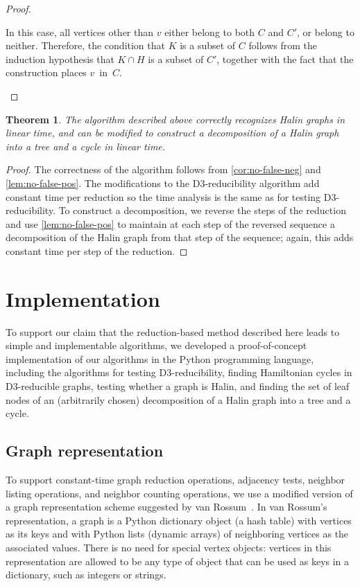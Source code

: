 \documentclass{article}
\newtheorem{theorem}{Theorem}
\begin{document}
\begin{proof}
\begin{itemize}
In this case, all vertices other than $v$ either belong to both $C$ and $C'$, or belong to neither.
Therefore, the condition that $K$ is a subset of $C$ follows from the induction hypothesis that $K\cap H$ is a subset of $C'$, together with the fact that the construction places $v$~in~$C$.\qedhere
\end{itemize}
\end{proof}

\begin{theorem}
The algorithm described above correctly recognizes Halin graphs in linear time,
and can be modified to construct a decomposition of a Halin graph into a tree and a cycle in linear time.
\end{theorem}

\begin{proof}
The correctness of the algorithm follows from \autoref{cor:no-false-neg} and \autoref{lem:no-false-pos}. The modifications to the D3-reducibility algorithm add constant time per reduction so the time analysis is the same as for testing D3-reducibility. To construct a decomposition, we reverse the steps of the reduction and use \autoref{lem:no-false-pos} to maintain at each step of the reversed sequence a decomposition of the Halin graph from that step of the sequence; again, this adds constant time per step of the reduction.
\end{proof}

\section{Implementation}

To support our claim that the reduction-based method described here leads to simple and implementable algorithms, we developed a proof-of-concept implementation of our algorithms in the Python programming language, including the algorithms for testing D3-reducibility, finding Hamiltonian cycles in D3-reducible graphs, testing whether a graph is Halin, and finding the set of leaf nodes of an (arbitrarily chosen) decomposition of a Halin graph into a tree and a cycle.

\subsection{Graph representation}

To support constant-time graph reduction operations, adjacency tests, neighbor listing operations, and neighbor counting operations, we use a modified version of a graph representation scheme suggested by van Rossum~\cite{Ros-PP-98}. In van Rossum's representation, a graph is a Python dictionary object (a hash table) with vertices as its keys and with Python lists (dynamic arrays) of neighboring vertices as the associated values. There is no need for special vertex objects: vertices in this representation are allowed to be any type of object that can be used as keys in a dictionary, such as integers or strings.
\end{document}
